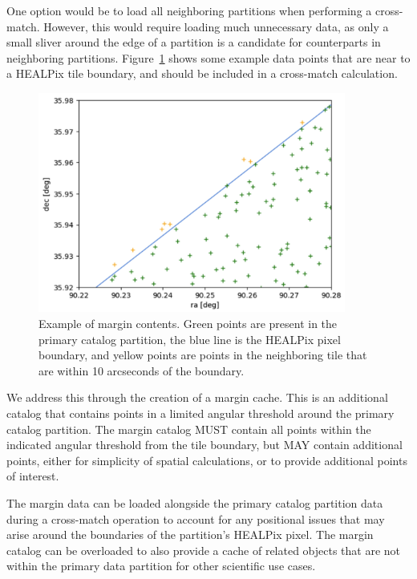 \documentclass[11pt,a4paper]{ivoa}
\begin{document}
One option would be to load all neighboring partitions when performing a cross-match. 
However, this would require loading much unnecessary data, as only a small sliver around the edge of a partition is a candidate for counterparts in neighboring partitions. 
Figure~\ref{fig:margin} shows some example data points that are near to a HEALPix tile boundary, and should be included in a cross-match calculation.

\begin{figure}
\centering
\includegraphics[width=0.9\textwidth]{margin-pix.png}
\caption{Example of margin contents. Green points are present in the primary catalog partition, the blue line is the HEALPix pixel boundary, and yellow points are points in the neighboring tile that are within 10 arcseconds of the boundary.}
\label{fig:margin}
\end{figure}

We address this through the creation of a margin cache.
This is an additional catalog that contains points in a limited angular threshold around the primary catalog partition.
The margin catalog MUST contain all points within the indicated angular threshold from the tile boundary, but MAY contain additional points, either for simplicity of spatial calculations, or to provide additional points of interest.\par

The margin data can be loaded alongside the primary catalog partition data during a cross-match operation to account for any positional issues that may arise around the boundaries of the partition's HEALPix pixel.
The margin catalog can be overloaded to also provide a cache of related objects that are not within the primary data partition for other scientific use cases.
\end{document}

